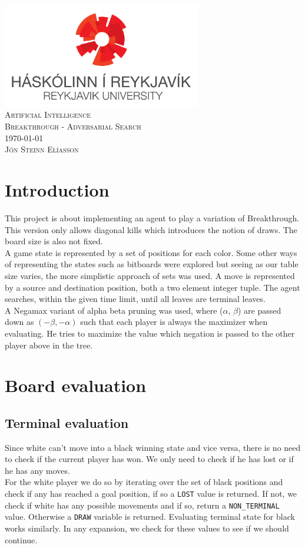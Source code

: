 \documentclass[11pt,a4paper,notitlepage]{article}
\makeatletter
\newcommand{\maketitlepage}
{
  \begin{titlepage}
    \begin{center}
      \ \\[2.5cm]
      \includegraphics[width=0.65\textwidth]{rulogo.png}\\[2.5cm]
      \textsc{\Huge Artificial Intelligence}\\[.5cm]
      \textsc{\LARGE Breakthrough - Adversarial Search}\\[1.2cm]
      \textsc{\Large \today}\\[4cm]
      \textsc{\huge Jón Steinn Elíasson}\\[.3cm]      
      \text{jonse07@ru.is}
    \end{center}
    \vfill
  \end{titlepage}
}
\newcommand{\maketocpage}
{
  \tableofcontents
  \listoftables
  \listoffigures
  \lstlistoflistings
  \vfill
  \clearpage
}
\makeatother
\begin{document}
\maketitlepage{}
\maketocpage{}

\section{Introduction}
This project is about implementing an agent to play a variation of Breakthrough. This version only allows diagonal kills which introduces the notion of draws. The board size is also not fixed.\\

A game state is represented by a set of positions for each color. Some other ways of representing the states such as bitboards were explored but seeing as our table size varies, the more simplistic approach of sets was used. A move is represented by a source and destination position, both a two element integer tuple. The agent searches, within the given time limit, until all leaves are terminal leaves.\\

A Negamax variant of alpha beta pruning was used, where ($\alpha$, $\beta$) are passed down as $(-\beta,-\alpha)$ such that each player is always the maximizer when evaluating. He tries to maximize the value which negation is passed to the other player above in the tree.

\section{Board evaluation}
	\subsection{Terminal evaluation}
    	Since white can't move into a black winning state and vice versa, there is no need to check if the current player has won. We only need to check if he has lost or if he has any moves.\\
        
        For the white player we do so by iterating over the set of black positions and check if any has reached a goal position, if so a \texttt{LOST} value is returned. If not, we check if white has any possible movements and if so, return a \texttt{NON\_TERMINAL} value. Otherwise a \texttt{DRAW} variable is returned. Evaluating terminal state for black works similarly. In any expansion, we check for these values to see if we should continue.
        
\end{document}
